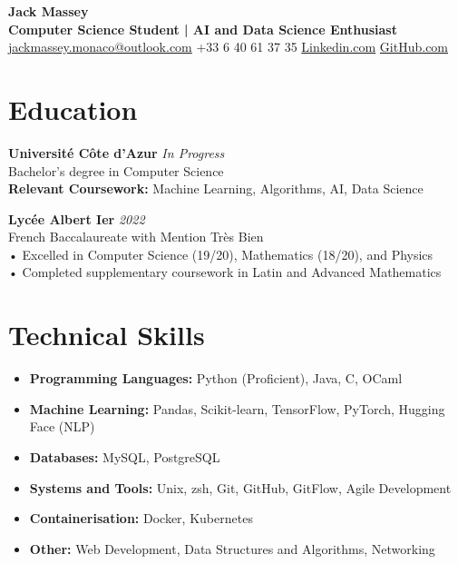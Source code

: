\documentclass[a4paper,10pt]{article}
\begin{document}
\pagestyle{empty}

\begin{center}
    {\Huge \textbf{Jack Massey}}\\
    \vspace{2pt}
    \textbf{Computer Science Student | AI and Data Science Enthusiast}\\
    \vspace{5pt}
    \faEnvelope \hspace{2pt} \href{mailto:jackmassey.monaco@outlook.com}{jackmassey.monaco@outlook.com} \quad
    \faPhone \hspace{2pt} +33 6 40 61 37 35 \quad
    \faLinkedin \hspace{2pt} \href{https://www.linkedin.com/in/jack-massey-3b608520a/}{Linkedin.com} \quad
    \faGithub \hspace{2pt} \href{https://github.com/TerminalGambit/}{GitHub.com}
\end{center}

\section*{Education}
\textbf{Université Côte d'Azur} \hfill \textit{In Progress}\\
Bachelor’s degree in Computer Science\\
\textbf{Relevant Coursework:} Machine Learning, Algorithms, AI, Data Science

\textbf{Lycée Albert Ier} \hfill \textit{2022}\\
French Baccalaureate with Mention Très Bien\\
• Excelled in Computer Science (19/20), Mathematics (18/20), and Physics\\
• Completed supplementary coursework in Latin and Advanced Mathematics

\section*{Technical Skills}
\begin{itemize}
    \item \textbf{Programming Languages:} Python (Proficient), Java, C, OCaml
    \item \textbf{Machine Learning:} Pandas, Scikit-learn, TensorFlow, PyTorch, Hugging Face (NLP)
    \item \textbf{Databases:} MySQL, PostgreSQL
    \item \textbf{Systems and Tools:} Unix, zsh, Git, GitHub, GitFlow, Agile Development
    \item \textbf{Containerisation:} Docker, Kubernetes
    \item \textbf{Other:} Web Development, Data Structures and Algorithms, Networking
\end{itemize}
\end{document}
